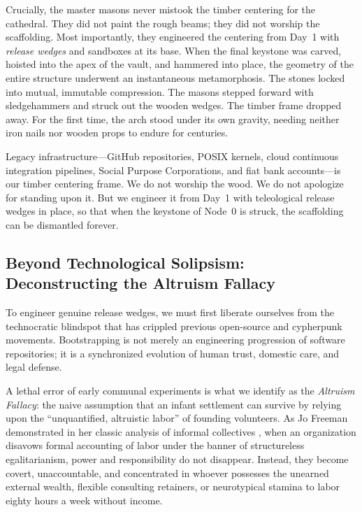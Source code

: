 Crucially, the master masons never mistook the timber centering for the cathedral. They did not paint the rough beams; they did not worship the scaffolding. Most importantly, they engineered the centering from Day~1 with \textit{release wedges} and sandboxes at its base. When the final keystone was carved, hoisted into the apex of the vault, and hammered into place, the geometry of the entire structure underwent an instantaneous metamorphosis. The stones locked into mutual, immutable compression. The masons stepped forward with sledgehammers and struck out the wooden wedges. The timber frame dropped away. For the first time, the arch stood under its own gravity, needing neither iron nails nor wooden props to endure for centuries.

Legacy infrastructure---GitHub repositories, POSIX kernels, cloud continuous integration pipelines, Social Purpose Corporations, and fiat bank accounts---is our timber centering frame. We do not worship the wood. We do not apologize for standing upon it. But we engineer it from Day~1 with teleological release wedges in place, so that when the keystone of Node~0 is struck, the scaffolding can be dismantled forever.

\subsection{Beyond Technological Solipsism: Deconstructing the Altruism Fallacy}
\label{subsec:altruism_fallacy}

To engineer genuine release wedges, we must first liberate ourselves from the technocratic blindspot that has crippled previous open-source and cypherpunk movements. Bootstrapping is not merely an engineering progression of software repositories; it is a synchronized evolution of human trust, domestic care, and legal defense.

A lethal error of early communal experiments is what we identify as the \textit{Altruism Fallacy}: the naive assumption that an infant settlement can survive by relying upon the ``unquantified, altruistic labor'' of founding volunteers. As Jo Freeman demonstrated in her classic analysis of informal collectives \parencite{freeman1972}, when an organization disavows formal accounting of labor under the banner of structureless egalitarianism, power and responsibility do not disappear. Instead, they become covert, unaccountable, and concentrated in whoever possesses the unearned external wealth, flexible consulting retainers, or neurotypical stamina to labor eighty hours a week without income. 

